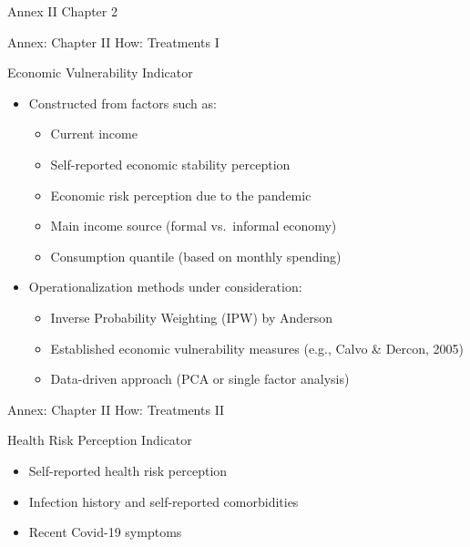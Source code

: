 \documentclass[
  ignorenonframetext,
]{beamer}
\providecommand{\tightlist}{%
  \setlength{\itemsep}{0pt}\setlength{\parskip}{0pt}}\usepackage{longtable,booktabs,array}
\begin{document}
\begin{frame}[fragile]{Annex II Chapter 2}
\begin{block}{Annex: Chapter II How: Treatments I}
\label{annex-chapter-ii-how-treatments-i}
\begin{block}{Economic Vulnerability Indicator}
\label{economic-vulnerability-indicator}
\begin{itemize}
\tightlist
\item
  Constructed from factors such as:

  \begin{itemize}
  \tightlist
  \item
    Current income
  \item
    Self-reported economic stability perception
  \item
    Economic risk perception due to the pandemic
  \item
    Main income source (formal vs.~informal economy)
  \item
    Consumption quantile (based on monthly spending)
  \end{itemize}
\item
  Operationalization methods under consideration:

  \begin{itemize}
  \tightlist
  \item
    Inverse Probability Weighting (IPW) by Anderson
  \item
    Established economic vulnerability measures (e.g., Calvo \& Dercon,
    2005)
  \item
    Data-driven approach (PCA or single factor analysis)
  \end{itemize}
\end{itemize}
\end{block}
\end{block}

\begin{block}{Annex: Chapter II How: Treatments II}
\label{annex-chapter-ii-how-treatments-ii}
\begin{block}{Health Risk Perception Indicator}
\label{health-risk-perception-indicator}
\begin{itemize}
\tightlist
\item
  Self-reported health risk perception
\item
  Infection history and self-reported comorbidities
\item
  Recent Covid-19 symptoms
\end{itemize}
\end{block}


\end{block}
\end{frame}
\end{document}

